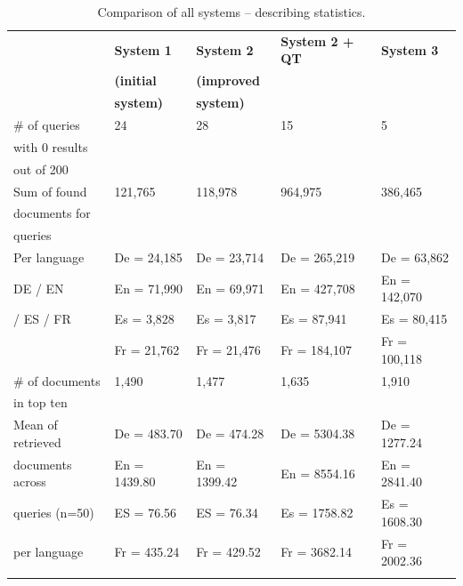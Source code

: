 \documentclass[a4paper,11pt]{article}
\begin{document}
\begin{table}[ht]
\centering
\begin{tabularx}{\textwidth}{lllll}
\toprule
\addlinespace
& \textbf{System 1} & \textbf{System 2} & \textbf{System 2 + QT} & \textbf{System 3} \\
& \textbf{(initial} & \textbf{(improved} &  &  \\
& \textbf{system)}  & \textbf{system)} & & \\
\addlinespace
\cmidrule{1-5}
\addlinespace
\# of queries & 24 & 28 & 15 & 5
 \\
with 0 results & & & & \\
out of 200 & & & & \\
\addlinespace
Sum of found & 121,765 & 118,978 & 964,975 & 386,465
 \\
documents for & & & & \\
queries & & & & \\
\addlinespace
Per language & De = 24,185 & De = 23,714 & De = 265,219 & De = 63,862\\
DE / EN & En = 71,990 & En = 69,971 & En = 427,708 & En = 142,070 \\
/ ES / FR & Es = 3,828 & Es = 3,817 & Es = 87,941 & Es = 80,415 \\
& Fr = 21,762 & Fr = 21,476 & Fr = 184,107 & Fr = 100,118 \\
\addlinespace
\# of documents & 1,490 & 1,477 & 1,635 & 1,910 \\
in top ten & & & & \\
\addlinespace
Mean of retrieved & De = 483.70 & De = 474.28 & De = 5304.38 & De = 1277.24 \\
documents across & En = 1439.80 & En = 1399.42 & En = 8554.16 & En = 2841.40 \\
queries (n=50)  & ES = 76.56 & ES = 76.34 & Es = 1758.82 & Es = 1608.30 \\
per language & Fr = 435.24 & Fr = 429.52 & Fr = 3682.14 & Fr = 2002.36 \\ 
\addlinespace
\addlinespace
\bottomrule
\end{tabularx}
\caption{Comparison of all systems -- describing statistics.}
\label{comparison_all_systems}
\end{table}




\end{document}
